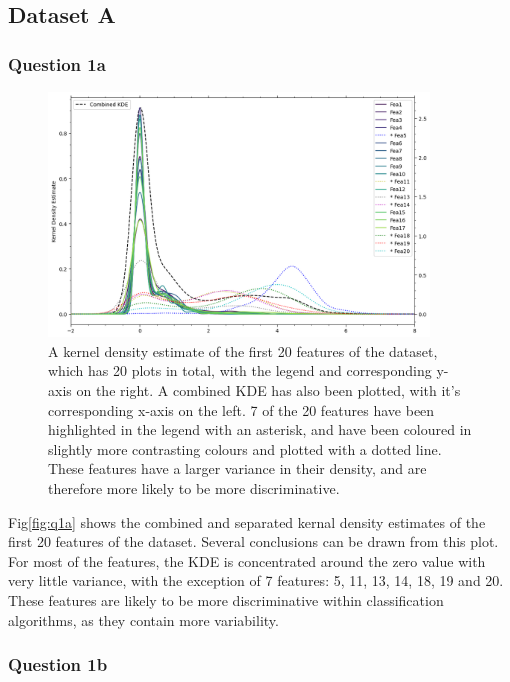 
\subsection{Dataset A}\label{subsec:dataset-a}
\subsubsection{Question 1a}\label{subsubsec:q1a}
    \begin{figure}[htb]
    \centering
    \includegraphics[width=0.9\textwidth]{./figures/q1a}
    \caption{A kernel density estimate of the first 20 features of the  dataset, which has 20
    plots in total, with the legend and corresponding y-axis on the right. A combined KDE has also been plotted, with
    it's corresponding x-axis on the left. 7 of the 20 features have been highlighted in the legend with an asterisk,
    and have been coloured in slightly more contrasting colours and plotted with a dotted line. These features have a
    larger variance in their density, and are therefore more likely to be more discriminative.}
    \label{fig:q1a}
    \end{figure}

    Fig\eqref{fig:q1a} shows the combined and separated kernal density estimates of the first 20 features of the dataset.
    Several conclusions can be drawn from this plot.
    For most of the features, the KDE is concentrated around the zero value with very little variance, with the exception
    of 7 features: 5, 11, 13, 14, 18, 19 and 20.
    These features are likely to be more discriminative within classification algorithms, as they contain more variability.

\subsubsection{Question 1b}\label{subsubsec:q1b}

